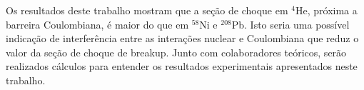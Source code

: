 \documentclass[a4paper,12pt,oneside]{book}
\begin{document}
\par Os resultados deste trabalho mostram que a seção de choque em $^4$He, próxima a barreira Coulombiana, é maior do que em $^{58}$Ni e $^{208}$Pb. Isto seria uma possível indicação de interferência entre as interações nuclear e Coulombiana que reduz o valor da seção de choque de breakup. Junto com colaboradores teóricos, serão realizados cálculos para entender os resultados experimentais apresentados neste trabalho.



%
%
%
\end{document}
